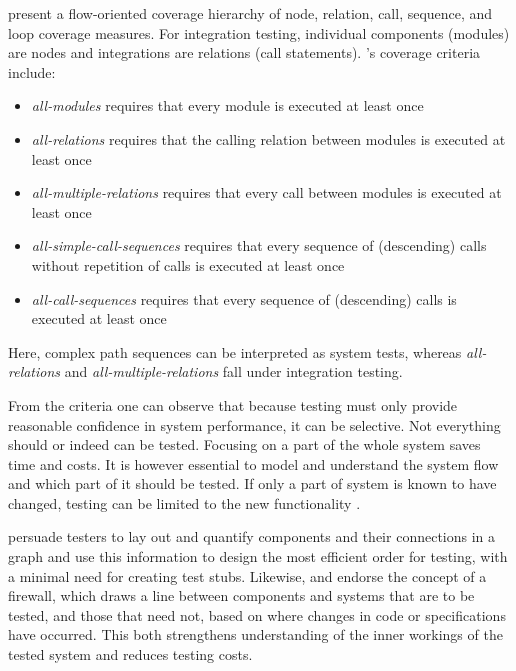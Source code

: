 \documentclass[12pt,a4paper,oneside,pdftex]{report}
\begin{document}
{\citet{linnenkugel1990test} present a flow-oriented coverage hierarchy of node, relation, call, sequence, and loop coverage measures. For integration testing, individual components (modules) are nodes and integrations are relations (call statements). \citeauthor{linnenkugel1990test}'s \citeyearpar{linnenkugel1990test} coverage criteria include:
\begin{itemize}
\item \emph{all-modules} requires that every module is executed at least once 
\item \emph{all-relations} requires that the calling relation between modules is executed at least once
\item \emph{all-multiple-relations} requires that every call between modules is executed at least once
\item \emph{all-simple-call-sequences} requires that every sequence of (descending) calls without repetition of calls is executed at least once
\item \emph{all-call-sequences} requires that every sequence of (descending) calls is executed at least once
\end{itemize}
Here, complex path sequences can be interpreted as system tests, whereas \emph{all-relations} and \emph{all-multiple-relations} fall under integration testing.

From the criteria one can observe that because testing must only provide reasonable confidence in system performance, it can be selective. Not everything should or indeed can be tested. Focusing on a part of the whole system saves time and costs. It is however essential to model and understand the system flow and which part of it should be tested. If only a part of system is known to have changed, testing can be limited to the new functionality \citep{bhyan2012survey}.

\citet{hewett2009automated} persuade testers to lay out and quantify components and their connections in a graph and use this information to design the most efficient order for testing, with a minimal need for creating test stubs. Likewise, \citet{leung1990study} and \citet{abdullah1995correcting} endorse the concept of a firewall, which draws a line between components and systems that are to be tested, and those that need not, based on where changes in code or specifications have occurred. This both strengthens understanding of the inner workings of the tested system and reduces testing costs. 

}
\end{document}
